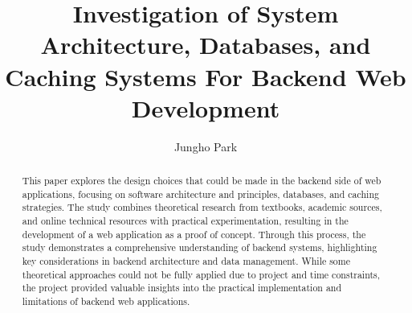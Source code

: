 \documentclass[12pt,code,palatino,picins,blacklinks,kaukecopyright,openright,oneside,final]{woosterthesis} %
\title{Investigation of System Architecture, Databases, and Caching Systems For Backend Web Development}
\author{Jungho Park}
\begin{document}
%
%

\frontmatter
{}

%                                                                                       
%                                                                                       

\begin{abstract}
This paper explores the design choices that could be made in the backend side of web applications,
focusing on software architecture and principles, databases, and caching strategies.
The study combines theoretical research from textbooks, academic sources, and online technical resources with practical experimentation,
resulting in the development of a web application as a proof of concept.
Through this process, the study demonstrates a comprehensive understanding of backend systems, highlighting key considerations in backend architecture and data management.
While some theoretical approaches could not be fully applied due to project and time constraints,
the project provided valuable insights into the practical implementation and limitations of backend web applications.
\end{abstract}

%                                                                                       
%                                                                                       



%                                                                                       
%                                                                                       
\end{document}
